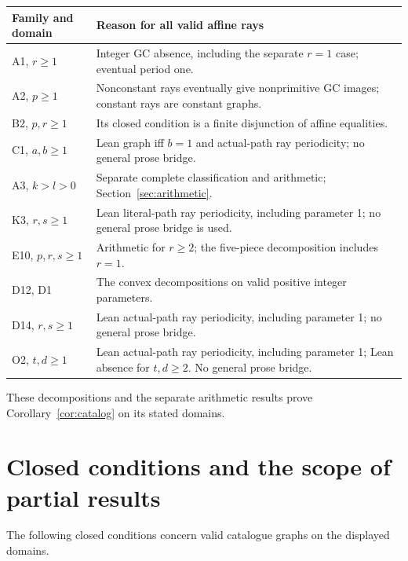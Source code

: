 \documentclass[11pt]{amsart}
\theoremstyle{definition}\newtheorem{definition}{Definition}
\begin{document}
\begin{center}\small
\begin{tabular}{p{}p{}}\toprule
Family and domain & Reason for all valid affine rays\\\midrule
A1, $r\ge1$ & Integer GC absence, including the separate $r=1$ case; eventual period one.\\
A2, $p\ge1$ & Nonconstant rays eventually give nonprimitive GC images; constant rays are constant graphs.\\
B2, $p,r\ge1$ & Its closed condition is a finite disjunction of affine equalities.\\
C1, $a,b\ge1$ & Lean graph iff $b=1$ and actual-path ray periodicity; no general prose bridge.\\
A3, $k>l>0$ & Separate complete classification and arithmetic; Section~\ref{sec:arithmetic}.\\
K3, $r,s\ge1$ & Lean literal-path ray periodicity, including parameter 1; no general prose bridge is used.\\
E10, $p,r,s\ge1$ & Arithmetic for $r\ge2$; the five-piece decomposition includes $r=1$.\\
D12, D1 & The convex decompositions on valid positive integer parameters.\\
D14, $r,s\ge1$ & Lean actual-path ray periodicity, including parameter 1; no general prose bridge.\\
O2, $t,d\ge1$ & Lean actual-path ray periodicity, including parameter 1; Lean absence for $t,d\ge2$. No general prose bridge.\\\bottomrule
\end{tabular}
\end{center}
These decompositions and the separate arithmetic results prove
Corollary~\ref{cor:catalog} on its stated domains.

\section{Closed conditions and the scope of partial results}\label{sec:conditions}
The following closed conditions concern valid catalogue graphs on
the displayed domains.
\end{document}
